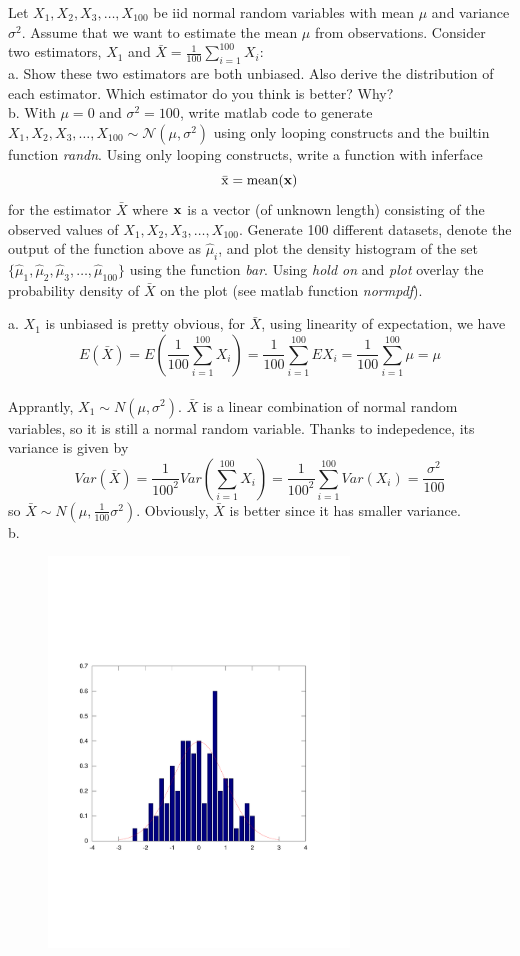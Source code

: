 \documentclass[12pt]{article}
\begin{document}
 {Let $X_1,X_2,X_3,\ldots,X_{100}$ be iid normal random 
variables with mean $\mu$ and variance $\sigma^2$.  Assume that we want to estimate 
the mean $\mu$ from observations. Consider two estimators, $X_1$ and $\bar{X}=\frac{1}{100}\sum_{i=1}^{100}X_i$: \\
a. Show these two estimators are both unbiased. Also derive the
distribution of each estimator. Which estimator do you think is better? Why?\\
b. With $\mu=0$ and $\sigma^2=100$, write matlab code to generate $X_1,X_2,X_3,\ldots,X_{100} \sim \mathcal{N}(\mu,\sigma^2)$ using only looping constructs and the builtin function {\em{randn}}. Using only looping constructs, write a function with inferface
\[
\mathrm{\bar{x} = mean(\bf x)}
\]
 for the estimator $\bar{X}$ where $\mathrm{\bf x}$ is a vector (of unknown length) consisting of the observed values of $X_1,X_2,X_3,\ldots,X_{100}$.  
Generate 100 different datasets, denote the output of the function above as $\hat{\mu}_i$, and plot the density histogram of the set $\{\hat{\mu}_1,
\hat{\mu}_2,\hat{\mu}_3,\ldots,\hat{\mu}_{100}\}$ using the function {\em bar}. Using {\em hold on} and {\em plot} overlay the probability density of $\bar{X}$ on the plot (see matlab function {\em normpdf}). \\}
 { \vfill
  \answer
}
 {
 a. $X_1$ is unbiased is pretty obvious, for $\bar{X}$, using linearity of expectation, we have
  \[E(\bar{X})=E(\frac{1}{100}\sum_{i=1}^{100}X_i)=\frac{1}{100}\sum_{i=1}^{100}EX_i=\frac{1}{100}\sum_{i=1}^{100}\mu=\mu \]\\
   Apprantly, $X_1\sim N(\mu,\sigma^2)$. $\bar{X}$ is a linear combination of normal random variables, so it is still a normal random variable. Thanks to indepedence, its variance is given by 
   \[Var(\bar{X})=\frac{1}{100^2}Var(\sum_{i=1}^{100}X_i)=\frac{1}{100^2}\sum_{i=1}^{100}Var(X_i)=\frac{\sigma^2}{100}\]
  so $\bar{X}\sim N(\mu, \frac{1}{100}\sigma^2)$. Obviously, $\bar{X}$ is better since it has smaller variance.\\

 b.
 \begin{figure}[htbp]
  \centering
  \includegraphics[width=8cm]{hist.pdf}
  \end{figure}

} 
\end{document}
